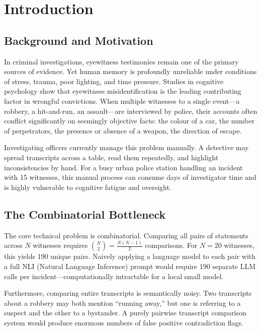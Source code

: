 \documentclass[12pt,a4paper]{report}
\begin{document}
\tableofcontents
\listoftables
\listoffigures

\clearpage
{}

\chapter{Introduction}

\section{Background and Motivation}

In criminal investigations, eyewitness testimonies remain one of the primary sources of evidence. Yet human memory is profoundly unreliable under conditions of stress, trauma, poor lighting, and time pressure. Studies in cognitive psychology show that eyewitness misidentification is the leading contributing factor in wrongful convictions. When multiple witnesses to a single event---a robbery, a hit-and-run, an assault---are interviewed by police, their accounts often conflict significantly on seemingly objective facts: the colour of a car, the number of perpetrators, the presence or absence of a weapon, the direction of escape.

Investigating officers currently manage this problem manually. A detective may spread transcripts across a table, read them repeatedly, and highlight inconsistencies by hand. For a busy urban police station handling an incident with 15 witnesses, this manual process can consume days of investigator time and is highly vulnerable to cognitive fatigue and oversight.

\section{The Combinatorial Bottleneck}

The core technical problem is combinatorial. Comparing all pairs of statements across $N$ witnesses requires $\binom{N}{2} = \frac{N(N-1)}{2}$ comparisons. For $N=20$ witnesses, this yields 190 unique pairs. Naively applying a language model to each pair with a full NLI (Natural Language Inference) prompt would require 190 separate LLM calls per incident---computationally intractable for a local small model.

Furthermore, comparing entire transcripts is semantically noisy. Two transcripts about a robbery may both mention ``running away,'' but one is referring to a suspect and the other to a bystander. A purely pairwise transcript comparison system would produce enormous numbers of false positive contradiction flags.
\end{document}
